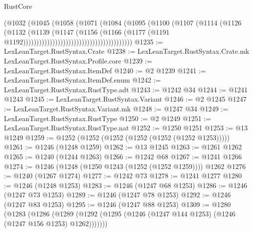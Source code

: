 \begin{lexlean}{RustCore}
\begin{coremodule}
                                                    (@1032
                                                      (@1045
                                                        (@1058
                                                          (@1071
                                                            (@1084
                                                              (@1095
                                                                (@1100
                                                                  (@1107
                                                                    (@1114
                                                                      (@1126
                                                                        (@1132
                                                                          (@1139
                                                                            (@1147
                                                                              (@1156
                                                                                (@1166
                                                                                  (@1177
                                                                                    (@1191
                                                                                      @1192)))))))))))))))))))))))))))))))))))))))))
@1235 := LexLeanTarget.RustSyntax.Crate
@1238 := LexLeanTarget.RustSyntax.Crate.mk LexLeanTarget.RustSyntax.Profile.core
@1239 := LexLeanTarget.RustSyntax.ItemDef
@1240 := @2 @1239
@1241 := LexLeanTarget.RustSyntax.ItemDef.enum
@1242 := LexLeanTarget.RustSyntax.RustType.adt
@1243 := @1242 @34
@1244 := @1241 @1243
@1245 := LexLeanTarget.RustSyntax.Variant
@1246 := @2 @1245
@1247 := LexLeanTarget.RustSyntax.Variant.mk
@1248 := @1247 @34
@1249 := LexLeanTarget.RustSyntax.RustType
@1250 := @2 @1249
@1251 := LexLeanTarget.RustSyntax.RustType.nat
@1252 := @1250 @1251
@1253 := @13 @1249
@1259 := @1252 (@1252 (@1252 (@1252 (@1252 (@1252 @1253)))))
@1261 := @1246 (@1248 @1259)
@1262 := @13 @1245
@1263 := @1261 @1262
@1265 := @1240 (@1244 @1263)
@1266 := @1242 @68
@1267 := @1241 @1266
@1274 := @1246 (@1248 (@1250 @1243 (@1252 (@1252 @1259)))) @1262
@1276 := @1240 (@1267 @1274)
@1277 := @1242 @73
@1278 := @1241 @1277
@1280 := @1246 (@1248 @1253)
@1283 := @1246 (@1247 @68 @1253)
@1286 := @1246 (@1247 @73 @1253)
@1289 := @1246 (@1247 @78 @1253)
@1292 := @1246 (@1247 @83 @1253)
@1295 := @1246 (@1247 @88 @1253)
@1309 := @1280
    (@1283
      (@1286 (@1289 (@1292 (@1295 (@1246 (@1247 @144 @1253) (@1246 (@1247 @156 @1253) @1262)))))))

\end{coremodule}
\end{lexlean}
